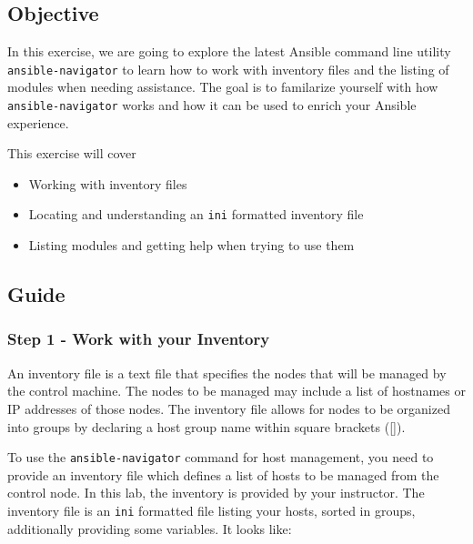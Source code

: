 \hypertarget{objective}{%
\subsection{Objective}\label{objective}}

In this exercise, we are going to explore the latest Ansible command
line utility \texttt{ansible-navigator} to learn how to work with
inventory files and the listing of modules when needing assistance. The
goal is to familarize yourself with how \texttt{ansible-navigator} works
and how it can be used to enrich your Ansible experience.

This exercise will cover

\begin{itemize}
\tightlist
\item
  Working with inventory files
\item
  Locating and understanding an \texttt{ini} formatted inventory file
\item
  Listing modules and getting help when trying to use them
\end{itemize}

\hypertarget{guide}{%
\subsection{Guide}\label{guide}}

\hypertarget{step-1---work-with-your-inventory}{%
\subsubsection{Step 1 - Work with your
Inventory}\label{step-1---work-with-your-inventory}}

An inventory file is a text file that specifies the nodes that will be
managed by the control machine. The nodes to be managed may include a
list of hostnames or IP addresses of those nodes. The inventory file
allows for nodes to be organized into groups by declaring a host group
name within square brackets ({[}{]}).

To use the \texttt{ansible-navigator} command for host management, you
need to provide an inventory file which defines a list of hosts to be
managed from the control node. In this lab, the inventory is provided by
your instructor. The inventory file is an \texttt{ini} formatted file
listing your hosts, sorted in groups, additionally providing some
variables. It looks like:

\begin{Shaded}
\begin{Highlighting}[]
\ExtensionTok{[web]}
\OperatorTok{\textless{}}\OperatorTok{\textgreater{}}

\ExtensionTok{[control]}
\end{Highlighting}
\end{Shaded}

